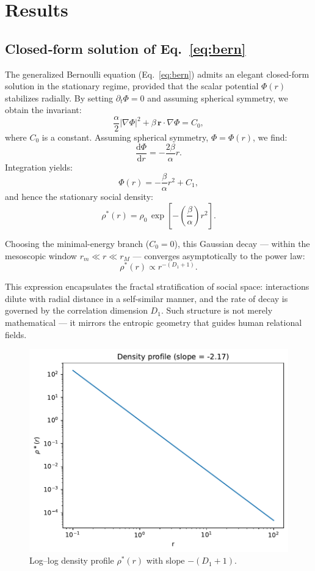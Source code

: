 
\section{Results}\label{sec:results}

\subsection{Closed‑form solution of Eq.~\ref{eq:bern}}

The generalized Bernoulli equation (Eq.~\ref{eq:bern}) admits an elegant closed-form solution in the stationary regime, provided that the scalar potential \(\Phi(r)\) stabilizes radially. By setting \(\partial_t\Phi = 0\) and assuming spherical symmetry, we obtain the invariant:
\begin{equation}
\frac{\alpha}{2}\left|\nabla\Phi\right|^{2} + \beta\,\mathbf{r}\cdot\nabla\Phi = C_0, \label{eq:bern_results}
\end{equation}
where \(C_0\) is a constant.  
Assuming spherical symmetry, \(\Phi = \Phi(r)\), we find:
\[
\frac{\mathrm{d}\Phi}{\mathrm{d}r} = -\frac{2\beta}{\alpha}r.
\]
Integration yields:
\[
\Phi(r) = -\frac{\beta}{\alpha}r^2 + C_1,
\]
and hence the stationary social density:
\begin{equation}
\rho^\ast(r) = \rho_0\,\exp\!\left[-\left(\frac{\beta}{\alpha}\right)r^2\right].
\end{equation}

Choosing the minimal-energy branch (\(C_0 = 0\)), this Gaussian decay — within the mesoscopic window \(r_m \ll r \ll r_M\) — converges asymptotically to the power law:
\begin{equation}
\rho^\ast(r) \propto r^{-(D_1 + 1)}.
\end{equation}

This expression encapsulates the fractal stratification of social space: interactions dilute with radial distance in a self-similar manner, and the rate of decay is governed by the correlation dimension \(D_1\). Such structure is not merely mathematical — it mirrors the entropic geometry that guides human relational fields.

\begin{figure}[ht]
  \centering
  \includegraphics[width=0.7\linewidth]{figs/Fig1_density.pdf}
  \caption{Log–log density profile $\rho^\ast(r)$ with slope $-(D_1+1)$.}
  \label{fig:density}
\end{figure}

